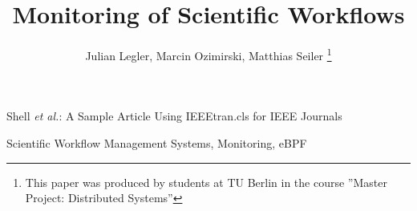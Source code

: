 \documentclass[lettersize,journal]{IEEEtran}
\begin{document}
	
	\title{Monitoring of Scientific Workflows}
	
	\author{Julian Legler, Marcin Ozimirski, Matthias Seiler
		\thanks{This paper was produced by students at TU Berlin in the course ''Master Project: Distributed Systems''}%
	}
	
	{Shell \MakeLowercase{\textit{et al.}}: A Sample Article Using IEEEtran.cls for IEEE Journals}
	
	
	\maketitle
	
	\begin{abstract}
		
	\end{abstract}
	
	\begin{IEEEkeywords}
		Scientific Workflow Management Systems, Monitoring, eBPF
	\end{IEEEkeywords}
	
\end{document}
